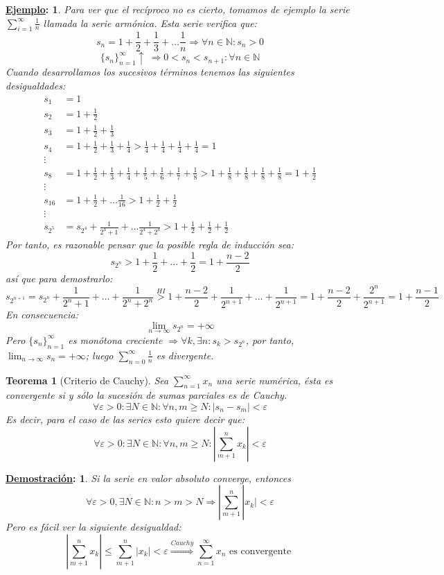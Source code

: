 \documentclass[10pt,a4paper,openright]{book}
\theoremstyle{break}
\newtheorem*{theo}{Teorema}
\newtheorem*{demo}{\underline{Demostración}:}
\newtheorem*{ej}{\underline{Ejemplo}:}
\begin{document}
\begin{ej}
Para ver que el recíproco no es cierto, tomamos de ejemplo la serie $\sum_{i = 1 }^{\infty} \frac{1}{n}$ llamada la serie armónica. Esta serie verifica que:
$$s_n = 1 + \frac{1}{2} + \frac{1}{3} + \ldots \frac{1}{n}\Rightarrow \forall n\in \mathbb N : s_n > 0$$
$$\{ s_n\}_{n=1}^\infty \uparrow \ \Rightarrow  0< s_n < s_{n+1}: \forall n \in \mathbb N$$
Cuando desarrollamos los sucesivos términos tenemos las siguientes desigualdades:
\begin{align*}
s_1 &= 1 \\
s_2 &= 1 + \frac{1}{2} \\
s_3 &=  1 + \frac{1}{2} + \frac{1}{3} \\
s_4 &= 1 + \frac{1}{2} + \frac{1}{3} + \frac{1}{4} > \frac{1}{4} + \frac{1}{4} + \frac{1}{4} + \frac{1}{4} = 1 \\
\vdots \\
s_8 &= 1 + \frac{1}{2} + \frac{1}{3} + \frac{1}{4} + \frac{1}{5} + \frac{1}{6} + \frac{1}{7} + \frac{1}{8} > 1 + \frac{1}{8} + \frac{1}{8} + \frac{1}{8} + \frac{1}{8} = 1 + \frac{1}{2} \\
\vdots \\
s_{16} &= 1 + \frac{1}{2} + \ldots \frac{1}{16} >1 + \frac{1}{2} + \frac{1}{2} \\
\vdots \\
s_{2^5} &= s_{2^4} + \frac{1}{2^4 + 1} + \ldots \frac{1}{2^4 + 2^4} > 1 + \frac{1}{2} + \frac{1}{2} + \frac{1}{2}
\end{align*}
Por tanto, es razonable pensar que la posible regla de inducción sea:
$$s_{2^n} > 1 + \frac{1}{2} + \ldots + \frac{1}{2} = 1 + \frac{n-2}{2}$$
así que para demostrarlo:
$$s_{2^{n+1}} = s_{2^n} + \frac{1}{2^n + 1} + \ldots + \frac{1}{2^n + 2^n} \overset{HI}{>} 1 +  \frac{n-2}{2} + \frac{1}{2^{n + 1}} + \ldots  + \frac{1}{2^{n + 1}} = 1+\frac{n-2}{2}+\frac{2^n}{2^{n+1}}= 1 + \frac{n-1}{2}$$
En consecuencia:
$$\lim_{n \to \infty} s_{2^n} = + \infty$$
Pero $\{s_n\}_{n=1}^\infty$ es monótona creciente $\Rightarrow \forall k, \exists n: s_k >s_{2^n}$, por tanto, $\lim_{n \to \infty} s_n = + \infty$; luego $\sum_{n=0}^{\infty} \frac{1}{n}$ es divergente.
\end{ej}

\begin{theo}[Criterio de Cauchy]
Sea $\sum_{n=1}^{\infty} x_n$ una serie numérica, ésta es convergente si y sólo la sucesión de sumas parciales es de Cauchy.
$$\forall \varepsilon >0 : \exists N\in \mathbb N: \forall n,m\geq N: |s_n-s_m|<\varepsilon$$
Es decir, para el caso de las series esto quiere decir que:
$$\forall \varepsilon >0 : \exists N\in \mathbb N: \forall n,m\geq N: \left|\sum_{m+1}^{n} x_k\right|<\varepsilon$$
\end{theo}
\begin{demo}
Si la serie en valor absoluto converge, entonces
$$\forall \varepsilon > 0, \exists N \in \mathbb{N}: n > m > N \Rightarrow |\sum_{m+1}^{n} |x_k| < \varepsilon$$
Pero es fácil ver la siguiente desigualdad:
$$\left|\sum_{m+1}^{n} x_k\right| \leq \sum_{m+1}^{n} \left|x_k\right|  < \varepsilon \overset{Cauchy}{\Rightarrow} \sum_{n=1}^{\infty} x_n \mbox{ es convergente }$$
\end{demo}
\end{document}
